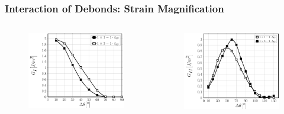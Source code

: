 \documentclass[first,firstsupp,lastsupp,last,hyperref,table]{ETHclass}
\begin{document}
\begin{frame}
\frametitle{\vspace{0.2cm}\small Interaction of Debonds: Strain Magnification}
\vspace{-.75cm}
\centering
\begin{columns}[c]
\centering
\begin{column}{0.5\textwidth}
\centering
\begin{figure}
\centering
\includegraphics[width=\columnwidth]{nxk-1-vf60-GI-strainmagni1.pdf}
\end{figure}
\end{column}
\begin{column}{0.5\textwidth}
\centering
\begin{figure}
\centering
\includegraphics[width=\columnwidth]{nxk-1-vf60-GII-strainmagni1.pdf}

\end{figure}
\end{column}
\end{columns}
\end{frame}
\end{document}
